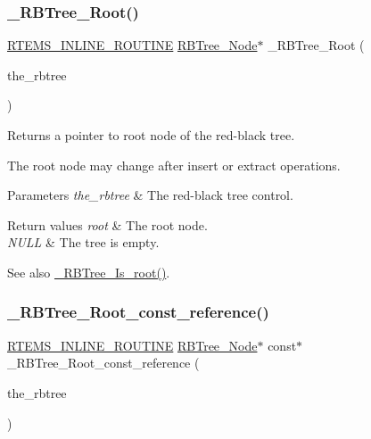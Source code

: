 \subsubsection{\texorpdfstring{\_RBTree\_Root()}{\_RBTree\_Root()}}
{\footnotesize\ttfamily \mbox{\hyperlink{group__RTEMSScoreBaseDefs_gac216239df231d5dbd15e3520b0b9313f}{R\+T\+E\+M\+S\+\_\+\+I\+N\+L\+I\+N\+E\+\_\+\+R\+O\+U\+T\+I\+NE}} \mbox{\hyperlink{structRBTree__Node}{R\+B\+Tree\+\_\+\+Node}}$\ast$ \+\_\+\+R\+B\+Tree\+\_\+\+Root (\begin{DoxyParamCaption}\item[{const R\+B\+Tree\+\_\+\+Control $\ast$}]{the\+\_\+rbtree }\end{DoxyParamCaption})}



Returns a pointer to root node of the red-\/black tree. 

The root node may change after insert or extract operations.


\begin{DoxyParams}{Parameters}
{\em the\+\_\+rbtree} & The red-\/black tree control.\\
\hline
\end{DoxyParams}

\begin{DoxyRetVals}{Return values}
{\em root} & The root node. \\
\hline
{\em N\+U\+LL} & The tree is empty.\\
\hline
\end{DoxyRetVals}
\begin{DoxySeeAlso}{See also}
\mbox{\hyperlink{group__RTEMSScoreRBTree_ga8496286f0a637353c8046e0d2625ea08}{\+\_\+\+R\+B\+Tree\+\_\+\+Is\+\_\+root()}}. 
\end{DoxySeeAlso}
\mbox{\label{group__RTEMSScoreRBTree_ga78ee0ed3eaeca6a2a70372bbfe872f7b}} 
\subsubsection{\texorpdfstring{\_RBTree\_Root\_const\_reference()}{\_RBTree\_Root\_const\_reference()}}
{\footnotesize\ttfamily \mbox{\hyperlink{group__RTEMSScoreBaseDefs_gac216239df231d5dbd15e3520b0b9313f}{R\+T\+E\+M\+S\+\_\+\+I\+N\+L\+I\+N\+E\+\_\+\+R\+O\+U\+T\+I\+NE}} \mbox{\hyperlink{structRBTree__Node}{R\+B\+Tree\+\_\+\+Node}}$\ast$ const$\ast$ \+\_\+\+R\+B\+Tree\+\_\+\+Root\+\_\+const\+\_\+reference (\begin{DoxyParamCaption}\item[{const R\+B\+Tree\+\_\+\+Control $\ast$}]{the\+\_\+rbtree }\end{DoxyParamCaption})}



